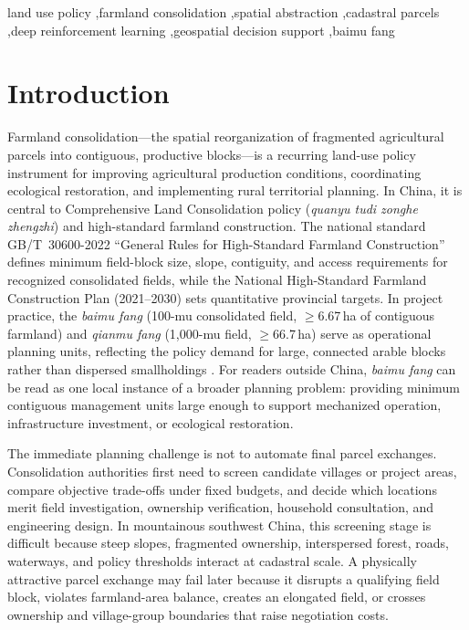 \documentclass[preprint,12pt]{elsarticle}
\begin{document}
\begin{frontmatter}
\begin{keyword}
land use policy \sep farmland consolidation \sep spatial abstraction \sep cadastral parcels \sep deep reinforcement learning \sep geospatial decision support \sep baimu fang
\end{keyword}

\end{frontmatter}


\section{Introduction}
\label{sec:intro}

Farmland consolidation---the spatial reorganization of fragmented agricultural parcels into contiguous, productive blocks---is a recurring land-use policy instrument for improving agricultural production conditions, coordinating ecological restoration, and implementing rural territorial planning. In China, it is central to Comprehensive Land Consolidation policy (\textit{quanyu tudi zonghe zhengzhi}) and high-standard farmland construction. The national standard GB/T~30600-2022 ``General Rules for High-Standard Farmland Construction'' \citep{gbt30600_2022} defines minimum field-block size, slope, contiguity, and access requirements for recognized consolidated fields, while the National High-Standard Farmland Construction Plan (2021--2030) \citep{moa2021plan} sets quantitative provincial targets. In project practice, the \textit{baimu fang} (100-mu consolidated field, $\geq$6.67\,ha of contiguous farmland) and \textit{qianmu fang} (1{,}000-mu field, $\geq$66.7\,ha) serve as operational planning units, reflecting the policy demand for large, connected arable blocks rather than dispersed smallholdings \citep{long2018land, liu2014land}. For readers outside China, \textit{baimu fang} can be read as one local instance of a broader planning problem: providing minimum contiguous management units large enough to support mechanized operation, infrastructure investment, or ecological restoration.

The immediate planning challenge is not to automate final parcel exchanges. Consolidation authorities first need to screen candidate villages or project areas, compare objective trade-offs under fixed budgets, and decide which locations merit field investigation, ownership verification, household consultation, and engineering design. In mountainous southwest China, this screening stage is difficult because steep slopes, fragmented ownership, interspersed forest, roads, waterways, and policy thresholds interact at cadastral scale. A physically attractive parcel exchange may fail later because it disrupts a qualifying field block, violates farmland-area balance, creates an elongated field, or crosses ownership and village-group boundaries that raise negotiation costs.
\end{document}
